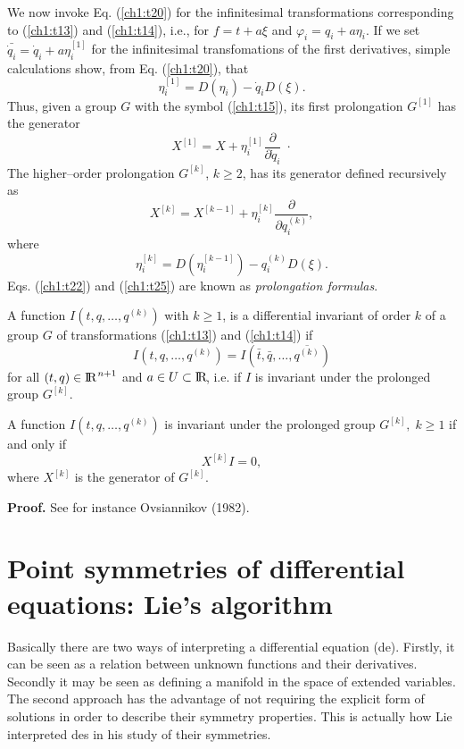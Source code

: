 We now invoke Eq. (\ref{ch1:t20}) for the infinitesimal transformations
corresponding to
(\ref{ch1:t13}) and (\ref{ch1:t14}), i.e., for $f=t+a\xi$ and $\varphi_i=q_i+a\eta_i$.
If we set $\bar{\dot q_i} =\dot q_i+a\eta_i^{[1]}$ for the infinitesimal
transfomations of the first derivatives, simple calculations show, from Eq.
(\ref{ch1:t20}), that
\begin{equation}
\label{ch1:t22}
\eta_i^{[1]}=D(\eta_i)-\dot q_i D(\xi).
\end{equation}
Thus, given a group $G$ with the symbol (\ref{ch1:t15}), its first
prolongation $G^{[1]}$ has the generator
\begin{equation}
\label{ch1:t23}
X^{[1]}=X+\eta_i^{[1]}\frac{\partial}{\partial \dot q_i}\; \cdot
\end{equation}
The higher--order prolongation $G^{[k]}$, $k\ge 2$, has its generator
defined recursively as 
\begin{equation}
\label{ch1:t24}
X^{[k]}=X^{[k-1]}+\eta_i^{[k]}\frac{\partial}{\partial  q_i^{(k)}},
\end{equation}
where
\begin{equation}
\label{ch1:t25}
\eta_i^{[k]}=D(\eta_i^{[k-1]})- q_i^{(k)}D(\xi).
\end{equation}
Eqs. (\ref{ch1:t22}) and (\ref{ch1:t25}) are known as
{\em prolongation formulas}.
\begin{defi}
\begin{em}
A function $I(t,q,\ldots, q^{(k)})$ with $k \ge 1$, is a differential
invariant of order $k$ of a group $G$ of transformations (\ref{ch1:t13}) and
(\ref{ch1:t14}) if
\[ I(t,q,\ldots, q^{(k)})=I(\bar t,\bar q,\ldots, \overline{q^{(k)}})\]
for all $(t,q)\in \mathrm{I\!R\!}^{\; n+1}$ and $a\in U\subset \mathrm{I\!R\!}$, i.e. if $I$ is
invariant under the prolonged group $G^{[k]}$.
\end{em}
\end{defi}
\begin{theo}
\begin{em}
A  function $I(t,q,\ldots,q^{(k)})$  is invariant under the prolonged group
$G^{[k]},\;k\ge 1$
if and only if
\[X^{[k]}I=0,\]
where $X^{[k]}$ is the generator of $G^{[k]}$. 
\end{em}
\end{theo}
{\bf Proof. } See for instance Ovsiannikov (1982).
\section{Point symmetries of differential equations: Lie's algorithm}
Basically there are two ways of interpreting a differential equation (de).
Firstly, it can be seen as a relation between  unknown
functions and their derivatives. Secondly it may be seen as defining a manifold
in the space of extended variables. The second approach has the advantage of
not requiring the explicit form of solutions in order to describe their
symmetry properties. This is actually how Lie interpreted des in his study of their
symmetries.

